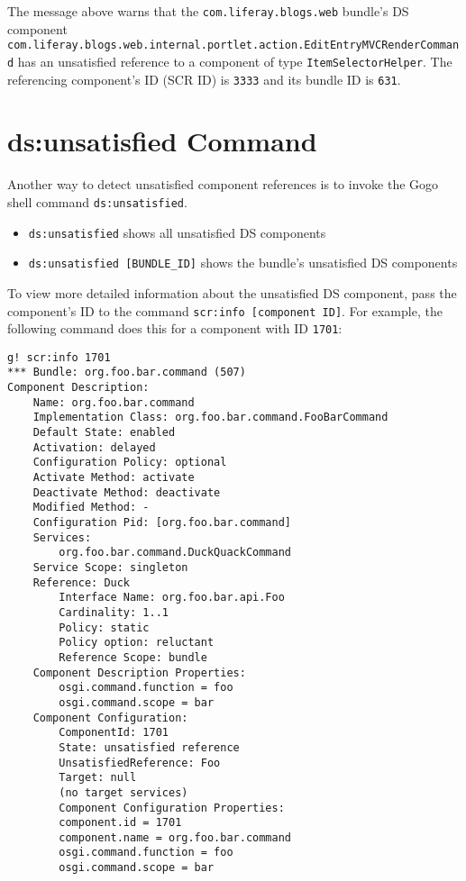 The message above warns that the \texttt{com.liferay.blogs.web} bundle's
DS component
\texttt{com.liferay.blogs.web.internal.portlet.action.EditEntryMVCRenderCommand}
has an unsatisfied reference to a component of type
\texttt{ItemSelectorHelper}. The referencing component's ID (SCR ID) is
\texttt{3333} and its bundle ID is \texttt{631}.

\section{ds:unsatisfied Command}\label{dsunsatisfied-command}

Another way to detect unsatisfied component references is to invoke the
Gogo shell command \texttt{ds:unsatisfied}.

\begin{itemize}
\tightlist
\item
  \texttt{ds:unsatisfied} shows all unsatisfied DS components
\item
  \texttt{ds:unsatisfied\ {[}BUNDLE\_ID{]}} shows the bundle's
  unsatisfied DS components
\end{itemize}

To view more detailed information about the unsatisfied DS component,
pass the component's ID to the command
\texttt{scr:info\ {[}component\ ID{]}}. For example, the following
command does this for a component with ID \texttt{1701}:

\begin{verbatim}
g! scr:info 1701
*** Bundle: org.foo.bar.command (507)
Component Description:
    Name: org.foo.bar.command
    Implementation Class: org.foo.bar.command.FooBarCommand
    Default State: enabled
    Activation: delayed
    Configuration Policy: optional
    Activate Method: activate
    Deactivate Method: deactivate
    Modified Method: -
    Configuration Pid: [org.foo.bar.command]
    Services:
        org.foo.bar.command.DuckQuackCommand
    Service Scope: singleton
    Reference: Duck
        Interface Name: org.foo.bar.api.Foo
        Cardinality: 1..1
        Policy: static
        Policy option: reluctant
        Reference Scope: bundle
    Component Description Properties:
        osgi.command.function = foo
        osgi.command.scope = bar
    Component Configuration:
        ComponentId: 1701
        State: unsatisfied reference
        UnsatisfiedReference: Foo
        Target: null
        (no target services)
        Component Configuration Properties:
        component.id = 1701
        component.name = org.foo.bar.command
        osgi.command.function = foo
        osgi.command.scope = bar
\end{verbatim}

